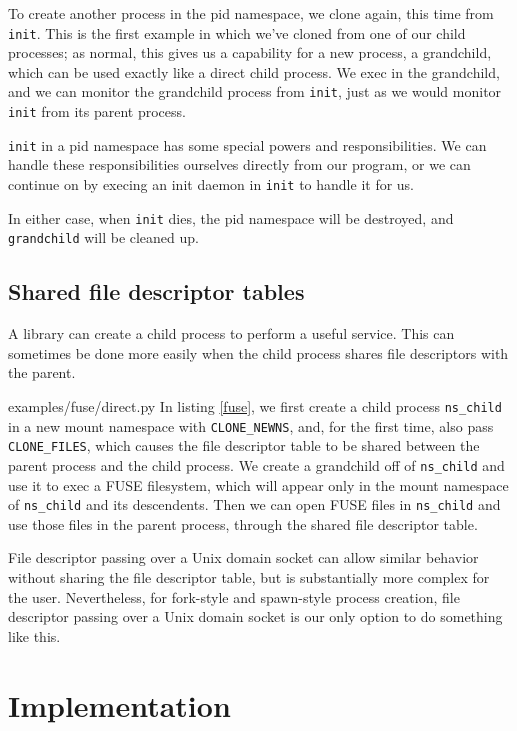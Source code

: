 \documentclass[letterpaper,twocolumn,10pt]{article}
\begin{document}
To create another process in the pid namespace,
we clone again, this time from \texttt{init}.
This is the first example in which we've cloned from one of our child processes;
as normal, this gives us a capability for a new process, a grandchild,
which can be used exactly like a direct child process.
We exec in the grandchild,
and we can monitor the grandchild process from \texttt{init},
just as we would monitor \texttt{init} from its parent process.

\texttt{init} in a pid namespace has some special powers and responsibilities.
We can handle these responsibilities ourselves directly from our program,
or we can continue on by execing an init daemon in \texttt{init} to handle it for us.

In either case, when \texttt{init} dies,
the pid namespace will be destroyed,
and \texttt{grandchild} will be cleaned up.
\subsection{Shared file descriptor tables}\label{shared_fd_table}
A library can create a child process to perform a useful service.
This can sometimes be done more easily when the child process shares file descriptors with the parent.


{examples/fuse/direct.py}
In listing \ref{fuse},
we first create a child process \verb|ns_child| in a new mount namespace with \verb|CLONE_NEWNS|,
and, for the first time, also pass \verb|CLONE_FILES|,
which causes the file descriptor table to be shared between the parent process and the child process.
We create a grandchild off of \verb|ns_child|
and use it to exec a FUSE filesystem,
which will appear only in the mount namespace of \verb|ns_child| and its descendents.
Then we can open FUSE files in \verb|ns_child|
and use those files in the parent process,
through the shared file descriptor table.

File descriptor passing over a Unix domain socket
can allow similar behavior without sharing the file descriptor table,
but is substantially more complex for the user.
Nevertheless, for fork-style and spawn-style process creation,
file descriptor passing over a Unix domain socket
is our only option to do something like this.
\section{Implementation}\label{implementation}
\end{document}
